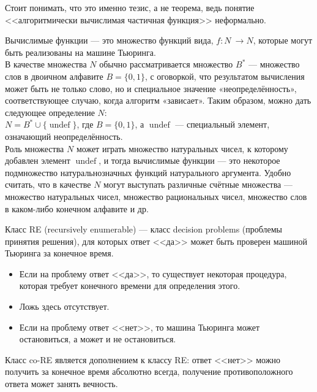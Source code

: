     \begin{Rem}
        Стоит понимать, что это именно тезис, а не теорема, ведь понятие <<алгоритмически вычислимая частичная функция>> неформально.
    \end{Rem}
    
    \begin{Def} 
        Вычислимые функции — это множество функций вида, $ f \colon N\ \to N $, которые могут быть реализованы на машине Тьюринга.\\
        В качестве множества $N$ обычно рассматривается множество $B^{*}$ — множество слов в двоичном алфавите $B = \{0,1\}$, с оговоркой, что результатом вычисления может быть не только слово, но и специальное значение «неопределённость», соответствующее случаю, когда алгоритм «зависает». Таким образом, можно дать следующее определение $N$:\\
        $N=B^{*}\cup \{\operatorname{undef} \}$, где $B=\{0,1\}$, а $\operatorname{undef}$ — специальный элемент, означающий неопределённость.\\
        Роль множества $N$ может играть множество натуральных чисел, к которому добавлен элемент $ \operatorname{undef} $, и тогда вычислимые функции --- это некоторое подмножество натуральнозначных функций натурального аргумента. Удобно считать, что в качестве $N$ могут выступать различные счётные множества --- множество натуральных чисел, множество рациональных чисел, множество слов в каком-либо конечном алфавите и др. 
    \end{Def}
    
    
    \begin{Def}[Классы RE и co-RE]
        Класс RE (recursively enumerable) --- класс decision problems (проблемы принятия решения), для которых ответ <<да>> может быть проверен машиной Тьюринга за конечное время.
        \begin{itemize}
            \item Если на проблему ответ <<да>>, то существует некоторая процедура, которая требует конечного времени для определения этого.
            \item Ложь здесь отсутствует.
            \item Если на проблему ответ <<нет>>, то машина Тьюринга может остановиться, а может и не остановиться.
        \end{itemize}
        Класс co-RE является дополнением к классу RE: ответ <<нет>> можно получить за конечное время абсолютно всегда, получение противоположного ответа может занять вечность.
    \end{Def}
    
